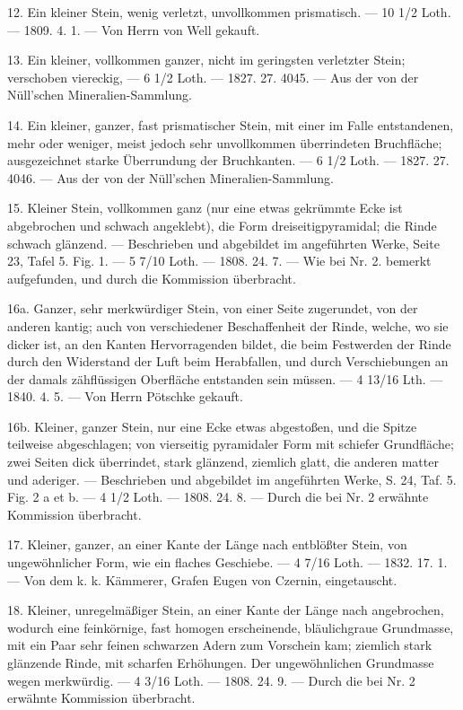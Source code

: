 \documentclass[a4paper, 11pt, oneside, polutonikogreek, german]{article}
\begin{document}
12. Ein kleiner Stein, wenig verletzt, unvollkommen prismatisch. — 10 1/2 Loth. — 1809. 4. 1. — Von Herrn von Well gekauft.

13. Ein kleiner, vollkommen ganzer, nicht im geringsten verletzter Stein; verschoben viereckig, — 6 1/2 Loth. — 1827. 27. 4045. — Aus der von der Nüll’schen Mineralien-Sammlung.

14. Ein kleiner, ganzer, fast prismatischer Stein, mit einer im Falle entstandenen, mehr oder weniger, meist jedoch sehr unvollkommen überrindeten Bruchfläche; ausgezeichnet starke Überrundung der Bruchkanten. — 6 1/2 Loth. — 1827. 27. 4046. — Aus der von der Nüll’schen Mineralien-Sammlung.

15. Kleiner Stein, vollkommen ganz (nur eine etwas gekrümmte Ecke ist abgebrochen und schwach angeklebt), die Form dreiseitigpyramidal; die Rinde schwach glänzend. — Beschrieben und abgebildet im angeführten Werke, Seite 23, Tafel 5. Fig. 1. — 5 7/10 Loth. — 1808. 24. 7. — Wie bei Nr. 2. bemerkt aufgefunden, und durch die Kommission überbracht.

16a. Ganzer, sehr merkwürdiger Stein, von einer Seite zugerundet, von der anderen kantig; auch von verschiedener Beschaffenheit der Rinde, welche, wo sie dicker ist, an den Kanten Hervorragenden bildet, die beim Festwerden der Rinde durch den Widerstand der Luft beim Herabfallen, und durch Verschiebungen an der damals zähflüssigen Oberfläche entstanden sein müssen. — 4 13/16 Lth. — 1840. 4. 5. — Von Herrn Pötschke gekauft. 

16b. Kleiner, ganzer Stein, nur eine Ecke etwas abgestoßen, und die Spitze teilweise abgeschlagen; von vierseitig pyramidaler Form mit schiefer Grundfläche; zwei Seiten dick überrindet, stark glänzend, ziemlich glatt, die anderen matter und aderiger. — Beschrieben und abgebildet im angeführten Werke, S. 24, Taf. 5. Fig. 2 a et b. — 4 1/2 Loth. — 1808. 24. 8. — Durch die bei Nr. 2 erwähnte Kommission überbracht.

17. Kleiner, ganzer, an einer Kante der Länge nach entblößter Stein, von ungewöhnlicher Form, wie ein flaches Geschiebe. — 4 7/16 Loth. — 1832. 17. 1. — Von dem k. k. Kämmerer, Grafen Eugen von Czernin, eingetauscht.

18. Kleiner, unregelmäßiger Stein, an einer Kante der Länge nach angebrochen, wodurch eine feinkörnige, fast homogen erscheinende, bläulichgraue Grundmasse, mit ein Paar sehr feinen schwarzen Adern zum Vorschein kam; ziemlich stark glänzende Rinde, mit scharfen Erhöhungen. Der ungewöhnlichen Grundmasse wegen merkwürdig. — 4 3/16 Loth. — 1808. 24. 9. — Durch die bei Nr. 2 erwähnte Kommission überbracht.
\end{document}
